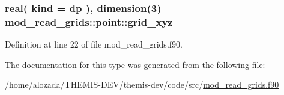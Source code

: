 \subsubsection[{\texorpdfstring{grid\+\_\+xyz}{grid_xyz}}]{\setlength{\rightskip}{0pt plus 5cm}real( kind = dp ), dimension(3) mod\+\_\+read\+\_\+grids\+::point\+::grid\+\_\+xyz}\hypertarget{structmod__read__grids_1_1point_a44e07983c85907248f16a1d5409902a8}{}\label{structmod__read__grids_1_1point_a44e07983c85907248f16a1d5409902a8}


Definition at line 22 of file mod\+\_\+read\+\_\+grids.\+f90.



The documentation for this type was generated from the following file\+:\begin{DoxyCompactItemize}
\item 
/home/alozada/\+T\+H\+E\+M\+I\+S-\/\+D\+E\+V/themis-\/dev/code/src/\hyperlink{mod__read__grids_8f90}{mod\+\_\+read\+\_\+grids.\+f90}\end{DoxyCompactItemize}
